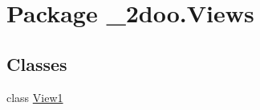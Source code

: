 \hypertarget{namespace__2doo_1_1_views}{
\section{Package \_\-2doo.Views}
\label{namespace__2doo_1_1_views}
}
\subsection*{Classes}
\begin{CompactItemize}
\item 
class \hyperlink{class__2doo_1_1_views_1_1_view1}{View1}
\end{CompactItemize}
